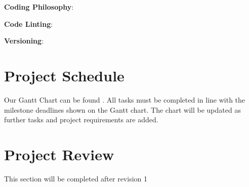 \documentclass{article}
\begin{document}
\noindent \textbf{Coding Philosophy}: \href{https://www.python.org/dev/peps/pep-0020/}{\color{blue}{The Zen of Python (pep20)}}

\noindent \textbf{Code Linting}: \href{https://www.pylint.org/}{\color{blue}{pylint}}

\noindent \textbf{Versioning}: \href{https://semver.org/}{\color{blue}{Semantic Versioning 2.0}}

\section{Project Schedule}

Our Gantt Chart can be found \href{https://gitlab.cas.mcmaster.ca/modyj/3xa3/-/tree/master/ProjectSchedule}{\color{blue}{here}}. All tasks must be completed in line with the milestone deadlines shown on the Gantt chart. The chart will be updated as further tasks and project requirements are added.

\section{Project Review}

This section will be completed after revision 1
\end{document}
